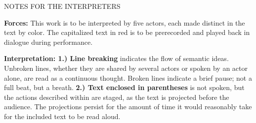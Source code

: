 \documentclass[12pt]{article}
\begin{document}
\vspace*{22\baselineskip}

\begingroup
\begin{center}
\huge NOTES FOR THE INTERPRETERS
\end{center}
\endgroup

\begingroup
\textbf{Forces:} This work is to be interpreted by five actors, each made distinct in the text by color. The capitalized text in red is to be prerecorded and played back in dialogue during performance. 
\endgroup

\begingroup
\textbf{Interpretation: 1.) Line breaking} indicates the flow of semantic ideas. Unbroken lines, whether they are shared by several actors or spoken by an actor alone, are read as a continuous thought. Broken lines indicate a brief pause; not a full beat, but a breath. \textbf{2.) Text enclosed in parentheses} is not spoken, but the actions described within are staged, as the text is projected before the audience. The projections persist for the amount of time it would reasonably take for the included text to be read aloud.
\endgroup
\end{document}
